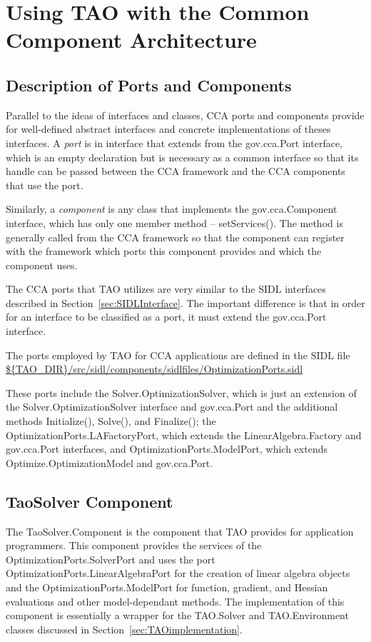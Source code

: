 \documentclass[doublespacing,12pt]{article}
\begin{document}
\section{Using TAO with the Common Component Architecture}

\subsection{Description of Ports and Components}
Parallel to the ideas of interfaces and classes, CCA ports and
components provide for well-defined abstract interfaces and concrete
implementations of theses interfaces.  A \textit{port} is in interface that
extends from the \textsf{gov.cca.Port} interface, which is an empty declaration
but is necessary as a common interface so that its handle can be
passed between the CCA framework and the CCA components that use the port.

Similarly, a \textit{component} is any class that implements the
\textsf{gov.cca.Component} interface, which 
has only one member method -- \textsf{setServices()}.  The method is generally
called from the CCA framework so that the component can register with
the framework which ports this component provides and which the
component uses. 

The CCA ports that TAO utilizes are very similar to the
SIDL interfaces described in Section~\ref{sec:SIDLInterface}.
The important difference is that in order for an interface to be
classified as a port, it must extend the \textsf{gov.cca.Port} interface.

The ports employed by TAO for CCA applications are defined in the SIDL file
\url{${TAO_DIR}/src/sidl/components/sidlfiles/OptimizationPorts.sidl} %

These ports
include the \textsf{Sol\-ver.Op\-ti\-mi\-za\-tion\-Sol\-ver}, which is just an extension of
the \textsf{Sol\-ver.Op\-ti\-mi\-za\-tion\-Sol\-ver} interface and \textsf{gov.cca.Port} and 
the additional methods \textsf{Initialize()}, \textsf{Solve()}, and
\textsf{Finalize()};
the \textsf{Op\-ti\-mi\-za\-tion\-Ports.LAFact\-oryPort}, which extends the
\textsf{Lin\-ear\-Al\-ge\-bra.Fact\-ory} and \textsf{gov.cca.Port} interfaces,
and \textsf{Op\-ti\-mi\-za\-tion\-Ports.ModelPort}, which extends
\textsf{Optimize.Op\-ti\-mi\-za\-tion\-Mod\-el} and \textsf{gov.cca.Port}.
\subsection{TaoSolver Component}
The \textsf{TaoSolver.Component} is the component that TAO provides for
application programmers.  This component provides the services of the
\textsf{Op\-ti\-mi\-za\-tion\-Ports.SolverPort} and uses the port
\textsf{Op\-ti\-mi\-za\-tion\-Ports.Lin\-ear\-Al\-ge\-bra\-Port} for the creation of linear algebra
objects and the \textsf{Op\-ti\-mi\-za\-tion\-Ports.ModelPort} for function, gradient,
and Hessian evaluations and other model-dependant methods.
The implementation of this component is essentially a wrapper for the
\textsf{TAO.Solver} and \textsf{TAO.En\-vi\-ron\-ment} classes discussed in 
Section~\ref{sec:TAOimplementation}.
\end{document}
